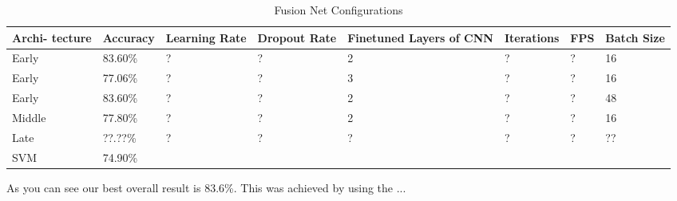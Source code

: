 \begin{table}[H]
\centering
\caption{Fusion Net Configurations}
\label{table:fusion_results}
\begin{tabularx}{\textwidth}{XXXXXXXX}
\toprule
Archi- tecture 		&  Accuracy	& Learning Rate 	& Dropout Rate	& Finetuned Layers of CNN & Iterations	& FPS & Batch Size \\ \midrule
Early  & 83.60\%  & ? & ? & 2 & ? & ? & 16 \\
Early  & 77.06\%  & ? & ? & 3 & ? & ? & 16 \\
Early  & 83.60\%  & ? & ? & 2 & ? & ? & 48 \\
Middle & 77.80\%  & ? & ? & 2 & ? & ? & 16 \\
Late   & ??.??\%  & ? & ? & ? & ? & ? & ?? \\
SVM           & 74.90\%  &   &   &   &   &   &    \\
\bottomrule
\end{tabularx}
\end{table}

As you can see our best overall result is 83.6\%.
This was achieved by using the ...